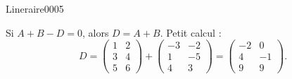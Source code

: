 \begin{corrige}{Lineraire0005}

	Si $A+B-D=0$, alors $D=A+B$. Petit calcul :
	\begin{equation}
		D=\begin{pmatrix}
			  1	&	2	\\ 
			    3	&	4	\\ 
			     5	&	6	
		     \end{pmatrix}
		     +
		\begin{pmatrix}
			-3	&	-2	\\
			1	&	-5	\\
			4	&	3	
		\end{pmatrix}
		=
		\begin{pmatrix}
			-2	&	0	\\
			4	&	-1	\\
			9	&	9	
		\end{pmatrix}.
	\end{equation}

\end{corrige}
